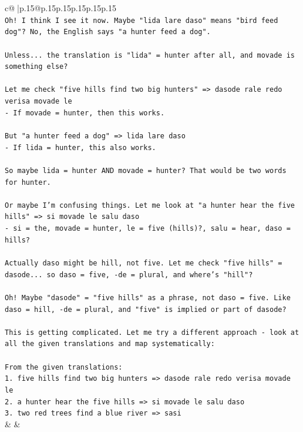 \documentclass{article}
\begin{document}
{\begin{supertabular}{c@{$\;$}|p{.15\linewidth}@{}p{.15\linewidth}p{.15\linewidth}p{.15\linewidth}p{.15\linewidth}p{.15\linewidth}}
{{{\\ 
\texttt{Oh! I think I see it now. Maybe "lida lare daso" means "bird feed dog"? No, the English says "a hunter feed a dog".} \\
\\ 
\texttt{Unless... the translation is "lida" = hunter after all, and movade is something else?} \\
\\ 
\texttt{Let me check "five hills find two big hunters" => dasode rale redo verisa movade le} \\
\texttt{{-} If movade = hunter, then this works.} \\
\\ 
\texttt{But "a hunter feed a dog" => lida lare daso} \\
\texttt{{-} If lida = hunter, this also works.} \\
\\ 
\texttt{So maybe lida = hunter AND movade = hunter? That would be two words for hunter.} \\
\\ 
\texttt{Or maybe I'm confusing things. Let me look at "a hunter hear the five hills" => si movade le salu daso} \\
\texttt{{-} si = the, movade = hunter, le = five (hills)?, salu = hear, daso = hills?} \\
\\ 
\texttt{Actually daso might be hill, not five. Let me check "five hills" = dasode... so daso = five, {-}de = plural, and where's "hill"?} \\
\\ 
\texttt{Oh! Maybe "dasode" = "five hills" as a phrase, not daso = five. Like daso = hill, {-}de = plural, and "five" is implied or part of dasode?} \\
\\ 
\texttt{This is getting complicated. Let me try a different approach {-} look at all the given translations and map systematically:} \\
\\ 
\texttt{From the given translations:} \\
\texttt{1. five hills find two big hunters => dasode rale redo verisa movade le} \\
\texttt{2. a hunter hear the five hills => si movade le salu daso} \\
\texttt{3. two red trees find a blue river => sasi} \\
            }
        }
    }
    & & \\ \\


\end{supertabular}}
\end{document}
